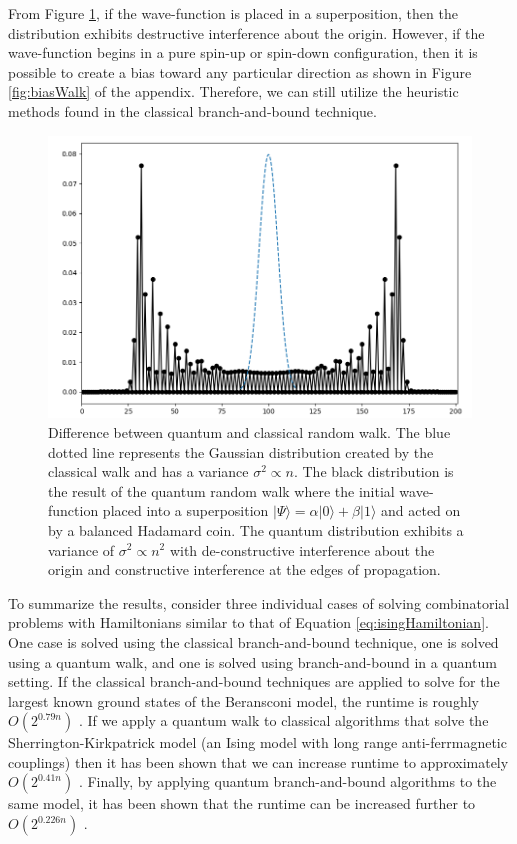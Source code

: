 From Figure \ref{fig:quantumWalk}, if the wave-function is placed in a superposition, then the distribution exhibits destructive interference about the origin.
However, if the wave-function begins in a pure spin-up or spin-down configuration, then it is possible to create a bias toward any particular direction as shown in Figure \ref{fig:biasWalk} of the appendix. 
Therefore, we can still utilize the heuristic methods found in the classical branch-and-bound technique. 
\begin{figure}[H]
	\begin{center}
		\includegraphics[width=13cm]{images/afunc2}
	\end{center}
	\caption{\doublespacing Difference between quantum and classical random walk. The blue dotted line represents the Gaussian distribution created by the classical walk and has a variance $\sigma^2 \propto n$. The black distribution is the result of the quantum random walk where the initial wave-function placed into a superposition $|\Psi\rangle = \alpha|0\rangle + \beta|1\rangle$ and acted on by a balanced Hadamard coin. The quantum distribution exhibits a variance of $\sigma^2 \propto n^2$ with de-constructive interference about the origin and constructive interference at the edges of propagation.}
	\label{fig:quantumWalk}
\end{figure}
\noindent
To summarize the results, consider three individual cases of solving combinatorial problems with Hamiltonians similar to that of Equation \ref{eq:isingHamiltonian}.
One case is solved using the classical branch-and-bound technique, one is solved using a quantum walk, and one is solved using branch-and-bound in a quantum setting. 
If the classical branch-and-bound techniques are applied to solve for the largest known ground states of the Beransconi model, the runtime is roughly $O(2^{0.79n})$ \cite{packebusch2016low}. 
If we apply a quantum walk to classical algorithms that solve the Sherrington-Kirkpatrick model (an Ising model with long range anti-ferrmagnetic couplings) then it has been shown that we can increase runtime to approximately $O(2^{0.41n})$ \cite{callison2019finding}. 
Finally, by applying quantum branch-and-bound algorithms to the same model, it has been shown that the runtime can be increased further to $O(2^{0.226n})$ \cite{montanaro2020quantum}.